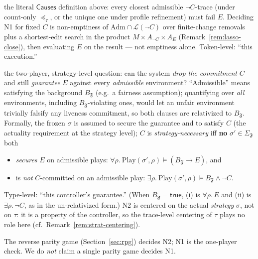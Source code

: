 \documentclass[11pt]{article}
\theoremstyle{remark}
\newcommand{\Lang}{\mathcal{L}}
\newcommand{\True}{\mathsf{true}}
\newcommand{\Frame}{\mathfrak{F}}
\newcommand{\Adm}{\mathrm{Adm}}
\begin{document}
\begin{description}[leftmargin=2.2cm,style=nextline]
  \item[Trace-existential necessity (N1)] the literal \(\mathsf{Causes}\)
        definition above: every closest admissible \(\neg C\)-trace (under
        count-only \(\preceq_\tau\), or the unique one under profile refinement)
        must fail \(E\). Deciding N1 for fixed \(C\) is non-emptiness of
        \(\Adm\cap\Lang(\neg C)\) over finite-change removals plus a
        shortest-edit search in the product \(M\times A_{\neg C}\times A_E\)
        (Remark~\ref{rem:lasso-close}), then evaluating \(E\) on the result --- not
        emptiness alone. Token-level: ``this execution.''
  \item[Strategy-guarantee necessity (N2)] the two-player, strategy-level
        question: can the system \emph{drop the commitment} \(C\) and still
        \emph{guarantee} \(E\) against every \emph{admissible} environment?
        ``Admissible'' means satisfying the background \(B_{\Frame}\) (e.g.\ a
        fairness assumption); quantifying over \emph{all} environments, including
        \(B_{\Frame}\)-violating ones, would let an unfair environment trivially
        falsify any liveness commitment, so both clauses are relativized to
        \(B_{\Frame}\). Formally, the frozen \(\sigma\) is assumed to secure the
        guarantee and to satisfy \(C\) (the actuality requirement at the strategy
        level); \(C\) is \emph{strategy-necessary} iff \textbf{no}
        \(\sigma'\in\Sigma_{\Frame}\) both
        \begin{itemize}
          \item[(i)] \emph{secures} \(E\) on admissible plays:
                \(\forall\rho.\ \mathrm{Play}(\sigma',\rho)\models
                (B_{\Frame}\rightarrow E)\), and
          \item[(ii)] is \emph{not} \(C\)-committed on an admissible play:
                \(\exists\rho.\ \mathrm{Play}(\sigma',\rho)\models
                B_{\Frame}\wedge\neg C\).
        \end{itemize}
        Type-level: ``this controller's guarantee.'' (When \(B_{\Frame}=\True\),
        (i) is \(\forall\rho.\,E\) and (ii) is \(\exists\rho.\,\neg C\), as in the
        un-relativized form.) N2 is centered on the actual \emph{strategy}
        \(\sigma\), not on \(\tau\): it is a property of the controller, so the
        trace-level centering of \(\tau\) plays no role here (cf.\
        Remark~\ref{rem:strat-centering}).
\end{description}
The reverse parity game (Section~\ref{sec:rpg}) decides N2; N1 is the one-player
check. We do \emph{not} claim a single parity game decides N1.
\end{document}
